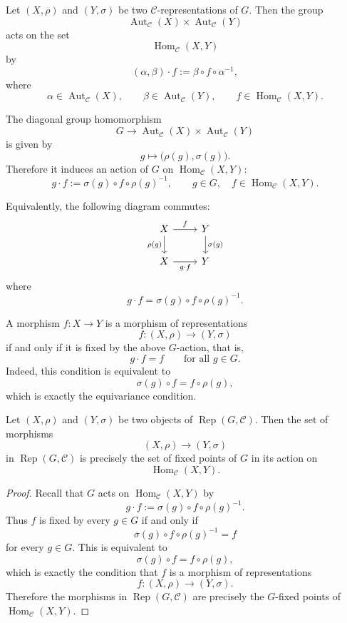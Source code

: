 Let \((X,\rho)\) and \((Y,\sigma)\) be two \(\mathcal{C}\)-representations of \(G\).
Then the group
\[
    \operatorname{Aut}_{\mathcal{C}}(X)\times \operatorname{Aut}_{\mathcal{C}}(Y)
\]
acts on the set
\[
    \operatorname{Hom}_{\mathcal{C}}(X,Y)
\]
by
\[
    (\alpha,\beta)\cdot f
    :=
    \beta\circ f\circ \alpha^{-1},
\]
where
\[
    \alpha\in \operatorname{Aut}_{\mathcal{C}}(X),\qquad
    \beta\in \operatorname{Aut}_{\mathcal{C}}(Y),\qquad
    f\in \operatorname{Hom}_{\mathcal{C}}(X,Y).
\]

The diagonal group homomorphism
\[
    G\longrightarrow
    \operatorname{Aut}_{\mathcal{C}}(X)\times \operatorname{Aut}_{\mathcal{C}}(Y)
\]
is given by
\[
    g\longmapsto \bigl(\rho(g),\sigma(g)\bigr).
\]
Therefore it induces an action of \(G\) on \(\operatorname{Hom}_{\mathcal{C}}(X,Y)\):
\[
    g\cdot f
    :=
    \sigma(g)\circ f\circ \rho(g)^{-1},
    \qquad
    g\in G,\quad f\in \operatorname{Hom}_{\mathcal{C}}(X,Y).
\]

Equivalently, the following diagram commutes:
\[
\begin{tikzcd}
    X \arrow[r,"f"] \arrow[d,"\rho(g)"']
        & Y \arrow[d,"\sigma(g)"] \\
    X \arrow[r,"g\cdot f"']
        & Y
\end{tikzcd}
\]
where
\[
    g\cdot f=\sigma(g)\circ f\circ \rho(g)^{-1}.
\]

\begin{remark}
    A morphism \(f:X\to Y\) is a morphism of representations
    \[
        f:(X,\rho)\longrightarrow (Y,\sigma)
    \]
    if and only if it is fixed by the above \(G\)-action, that is,
    \[
        g\cdot f=f
        \qquad
        \text{for all } g\in G.
    \]
    Indeed, this condition is equivalent to
    \[
        \sigma(g)\circ f=f\circ \rho(g),
    \]
    which is exactly the equivariance condition.
\end{remark}

\begin{lemma}
    Let \((X,\rho)\) and \((Y,\sigma)\) be two objects of
    \(\operatorname{Rep}(G,\mathcal{C})\). Then the set of morphisms
    \[
        (X,\rho)\longrightarrow (Y,\sigma)
    \]
    in \(\operatorname{Rep}(G,\mathcal{C})\) is precisely the set of fixed points
    of \(G\) in its action on
    \[
        \operatorname{Hom}_{\mathcal{C}}(X,Y).
    \]
\end{lemma}

\begin{proof}
    Recall that \(G\) acts on \(\operatorname{Hom}_{\mathcal{C}}(X,Y)\) by
    \[
        g\cdot f
        :=
        \sigma(g)\circ f\circ \rho(g)^{-1}.
    \]
    Thus \(f\) is fixed by every \(g\in G\) if and only if
    \[
        \sigma(g)\circ f\circ \rho(g)^{-1}=f
    \]
    for every \(g\in G\). This is equivalent to
    \[
        \sigma(g)\circ f=f\circ \rho(g),
    \]
    which is exactly the condition that \(f\) is a morphism of representations
    \[
        f:(X,\rho)\longrightarrow (Y,\sigma).
    \]
    Therefore the morphisms in \(\operatorname{Rep}(G,\mathcal{C})\) are precisely
    the \(G\)-fixed points of \(\operatorname{Hom}_{\mathcal{C}}(X,Y)\).
\end{proof}

